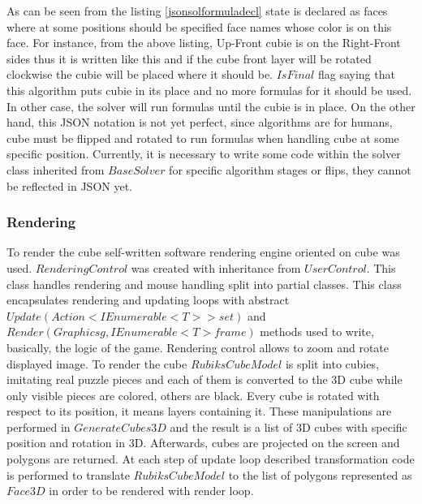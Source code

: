 \documentclass[../../main.tex]{subfiles}
\begin{document}
As can be seen from the listing \ref{jsonsolformuladecl} state is declared as faces where at some positions should be specified face names whose color is on this face. For instance, from the above listing, Up-Front cubie is on the Right-Front sides thus it is written like this and if the cube front layer will be rotated clockwise the cubie will be placed where it should be. $IsFinal$ flag saying that this algorithm puts cubie in its place and no more formulas for it should be used. In other case, the solver will run formulas until the cubie is in place.
On the other hand, this \ac{JSON} notation is not yet perfect, since algorithms are for humans, cube must be flipped and rotated to run formulas when handling cube at some specific position. Currently, it is necessary to write some code within the solver class inherited from $BaseSolver$ for specific algorithm stages or flips, they cannot be reflected in \ac{JSON} yet.

\subsubsection*{Rendering}

To render the cube self-written software rendering engine oriented on cube was used. $RenderingControl$ was created with inheritance from $UserControl$. This class handles rendering and mouse handling split into partial classes. This class encapsulates rendering and updating loops with abstract $Update(Action<IEnumerable<T>> set)$ and $Render(Graphics g, IEnumerable<T> frame)$ methods used to write, basically, the logic of the game. Rendering control allows to zoom and rotate displayed image. To render the cube $RubiksCubeModel$ is split into cubies, imitating real puzzle pieces and each of them is converted to the 3D cube while only visible pieces are colored, others are black. Every cube is rotated with respect to its position, it means layers containing it. These manipulations are performed in $GenerateCubes3D$ and the result is a list of 3D cubes with specific position and rotation in 3D. Afterwards, cubes are projected on the screen and polygons are returned. At each step of update loop described transformation code is performed to translate $RubiksCubeModel$ to the list of polygons represented as $Face3D$ in order to be rendered with render loop.
\end{document}
